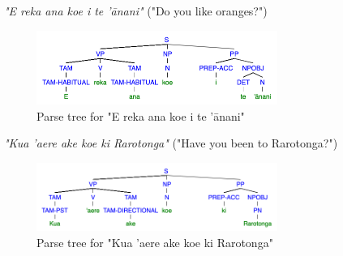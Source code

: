 \begin{enumarabic}
  \item \emph{"E reka ana koe i te 'ānani"} ("Do you like oranges?")
            
    \begin{figure}[H]
      \centering
      \includegraphics[width=0.7\textwidth]{figures/1.4.png}
      \caption{Parse tree for "E reka ana koe i te 'ānani"}
    \end{figure}

  \item \emph{"Kua 'aere ake koe ki Rarotonga"} ("Have you been to Rarotonga?")

    \begin{figure}[H]
      \centering
      \includegraphics[width=0.7\textwidth]{figures/1.5.png}
      \caption{Parse tree for "Kua 'aere ake koe ki Rarotonga"}
    \end{figure}
    
\end{enumarabic}
